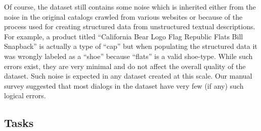 \documentclass[letterpaper]{article} %
\begin{document}
Of course, the dataset still contains some noise which is inherited either from the noise in the original catalogs crawled from various websites or because of the process used for creating structured data from unstructured textual descriptions. For example, a product titled ``California Bear Logo Flag Republic Flats Bill Snapback'' is actually a type of ``cap'' but when populating the structured data it was wrongly labeled as a ``shoe'' because ``flats'' is a valid shoe-type. While such errors exist, they are very minimal and do not affect the overall quality of the dataset. Such noise is expected in any dataset created at this scale. Our manual survey suggested that most dialogs in the dataset have very few (if any) such logical errors.

\subsection{Tasks}
\end{document}
